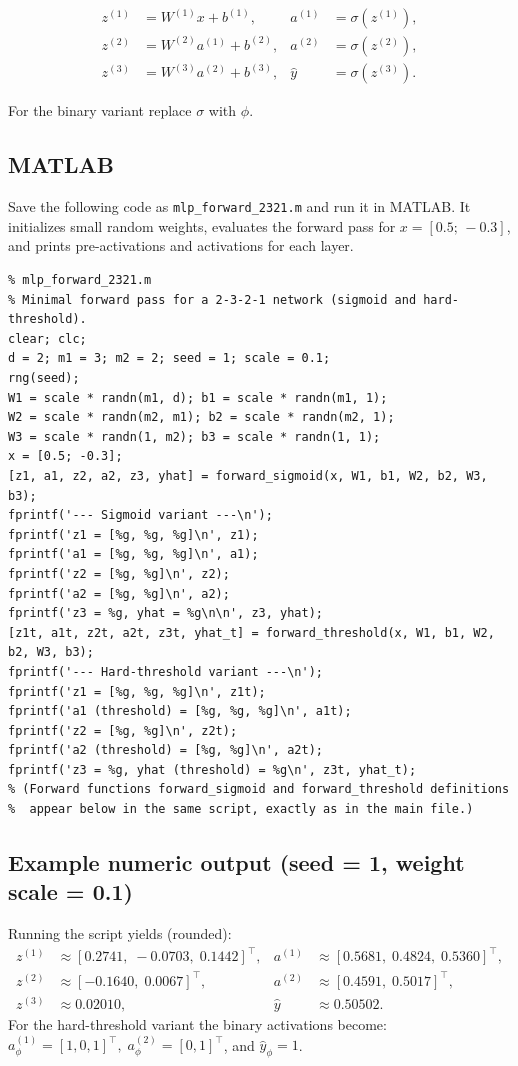 \documentclass[11pt,a4paper]{article}
\begin{document}
\[
\begin{aligned}
z^{(1)} &= W^{(1)} x + b^{(1)}, & a^{(1)} &= \sigma(z^{(1)}),\\[4pt]
z^{(2)} &= W^{(2)} a^{(1)} + b^{(2)}, & a^{(2)} &= \sigma(z^{(2)}),\\[4pt]
z^{(3)} &= W^{(3)} a^{(2)} + b^{(3)}, & \hat{y} &= \sigma(z^{(3)}).
\end{aligned}
\]

For the binary variant replace \(\sigma\) with \(\phi\).

\subsection*{MATLAB }
Save the following code as \texttt{mlp\_forward\_2321.m} and run it in MATLAB.
It initializes small random weights, evaluates the forward pass for
\(x=[0.5;\,-0.3]\), and prints pre-activations and activations for each layer.

\begin{verbatim}
% mlp_forward_2321.m
% Minimal forward pass for a 2-3-2-1 network (sigmoid and hard-threshold).
clear; clc;
d = 2; m1 = 3; m2 = 2; seed = 1; scale = 0.1;
rng(seed);
W1 = scale * randn(m1, d); b1 = scale * randn(m1, 1);
W2 = scale * randn(m2, m1); b2 = scale * randn(m2, 1);
W3 = scale * randn(1, m2); b3 = scale * randn(1, 1);
x = [0.5; -0.3];
[z1, a1, z2, a2, z3, yhat] = forward_sigmoid(x, W1, b1, W2, b2, W3, b3);
fprintf('--- Sigmoid variant ---\n');
fprintf('z1 = [%g, %g, %g]\n', z1);
fprintf('a1 = [%g, %g, %g]\n', a1);
fprintf('z2 = [%g, %g]\n', z2);
fprintf('a2 = [%g, %g]\n', a2);
fprintf('z3 = %g, yhat = %g\n\n', z3, yhat);
[z1t, a1t, z2t, a2t, z3t, yhat_t] = forward_threshold(x, W1, b1, W2, b2, W3, b3);
fprintf('--- Hard-threshold variant ---\n');
fprintf('z1 = [%g, %g, %g]\n', z1t);
fprintf('a1 (threshold) = [%g, %g, %g]\n', a1t);
fprintf('z2 = [%g, %g]\n', z2t);
fprintf('a2 (threshold) = [%g, %g]\n', a2t);
fprintf('z3 = %g, yhat (threshold) = %g\n', z3t, yhat_t);
% (Forward functions forward_sigmoid and forward_threshold definitions
%  appear below in the same script, exactly as in the main file.)
\end{verbatim}

\subsection*{Example numeric output (seed = 1, weight scale = 0.1)}
Running the script yields (rounded):
\[
\begin{aligned}
z^{(1)} &\approx [0.2741,\;-0.0703,\;0.1442]^\top, &
a^{(1)} &\approx [0.5681,\;0.4824,\;0.5360]^\top,\\
z^{(2)} &\approx [-0.1640,\;0.0067]^\top, &
a^{(2)} &\approx [0.4591,\;0.5017]^\top,\\
z^{(3)} &\approx 0.02010, & \hat{y} &\approx 0.50502.
\end{aligned}
\]
For the hard-threshold variant the binary activations become:
\(a^{(1)}_{\phi}=[1,0,1]^\top,\; a^{(2)}_{\phi}=[0,1]^\top\), and \(\hat y_{\phi}=1\).
\end{document}
